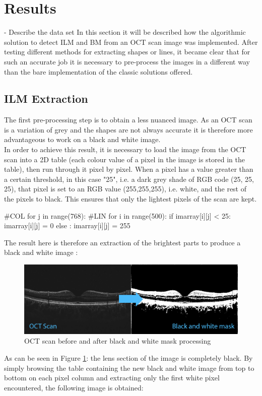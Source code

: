 \documentclass[12pt,a4paper]{scrartcl}
\begin{document}
\section{Results}
- Describe the data set
In this section it will be described how the algorithmic solution to detect ILM and BM from an OCT scan image was implemented. 
After testing different methods for extracting shapes or lines, it became clear that for such an accurate job it is necessary to pre-process the images in a different way than the bare implementation of the classic solutions offered. 
\subsection{ILM Extraction}\label{ILM_Extraction}
The first pre-processing step is to obtain a less nuanced image. As an OCT scan is a variation of grey and the shapes are not always accurate it is therefore more advantageous to work on a black and white image. \\
In order to achieve this result, it is necessary to load the image from the OCT scan into a 2D table (each colour value of a pixel in the image is stored in the table), then run through it pixel by pixel. When a pixel has a value greater than a certain threshold, in this case "25", i.e. a dark grey shade of RGB code (25, 25, 25), that pixel is set to an RGB value (255,255,255), i.e. white, and the rest of the pixels to black. This ensures that only the lightest pixels of the scan are kept. 
\begin{python}
#COL
for j in range(768):
  #LIN
  for i in range(500):
    if imarray[i][j] < 25:
      imarray[i][j] = 0
    else :
      imarray[i][j] = 255
\end{python}

The result here is therefore an extraction of the brightest parts to produce a black and white image :

\begin{figure}[H]
    \centering
    \includegraphics[width=1\textwidth]{./images/OCT_to_BW.png}
    \caption{OCT scan before and after black and white mask processing}
    \label{fig:oct_befor_after}
\end{figure}
As can be seen in Figure \ref{fig:oct_befor_after}: the lens section of the image is completely black. By simply browsing the table containing the new black and white image from top to bottom on each pixel column and extracting only the first white pixel encountered, the following image is obtained: 
\end{document}
